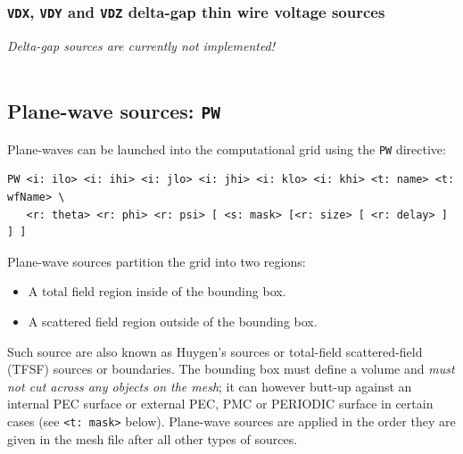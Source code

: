 \documentclass[onecolumn,a4paper]{article}
\numberwithin{equation}{section}
\begin{document}
\subsubsection{\texttt{VDX}, \texttt{VDY} and \texttt{VDZ} delta-gap thin wire voltage sources}

{\color{red}\it Delta-gap sources are currently not implemented!\\ \\}

\subsection{Plane-wave sources: \texttt{PW}}

Plane-waves can be launched into the computational grid using the
\texttt{PW} directive:
\begin{verbatim}
PW <i: ilo> <i: ihi> <i: jlo> <i: jhi> <i: klo> <i: khi> <t: name> <t: wfName> \
   <r: theta> <r: phi> <r: psi> [ <s: mask> [<r: size> [ <r: delay> ] ] ]
\end{verbatim}
Plane-wave sources partition the grid into two regions:
\begin{itemize}
 \item A total field region inside of the bounding box.
 \item A scattered field region outside of the bounding box.
\end{itemize}
Such source are also known as Huygen's sources or total-field
scattered-field (TFSF) sources or boundaries. The bounding box must 
define a volume and {\em must not cut across any objects on the mesh}; it can
however butt-up against an internal PEC surface or external PEC, PMC or PERIODIC 
surface in certain cases (see \texttt{<t:~mask>} below).
Plane-wave sources are applied in the order they are given in the mesh file
after all other types of sources.
\end{document}
